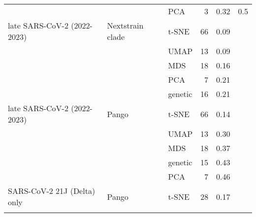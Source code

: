 \begin{tabular}{lllrrl}
                                        &                    &     PCA &               3 &                           0.32 &       0.5 \\
            late SARS-CoV-2 (2022-2023) &   Nextstrain clade &   t-SNE &              66 &                           0.09 &           \\
                                        &                    &    UMAP &              13 &                           0.09 &           \\
                                        &                    &     MDS &              18 &                           0.16 &           \\
                                        &                    &     PCA &               7 &                           0.21 &           \\
                                        &                    & genetic &              16 &                           0.21 &           \\
            late SARS-CoV-2 (2022-2023) &              Pango &   t-SNE &              66 &                           0.14 &           \\
                                        &                    &    UMAP &              13 &                           0.30 &           \\
                                        &                    &     MDS &              18 &                           0.37 &           \\
                                        &                    & genetic &              15 &                           0.43 &           \\
                                        &                    &     PCA &               7 &                           0.46 &           \\
            SARS-CoV-2 21J (Delta) only &              Pango &   t-SNE &              28 &                           0.17 &           \\
\botrule
\end{tabular}
